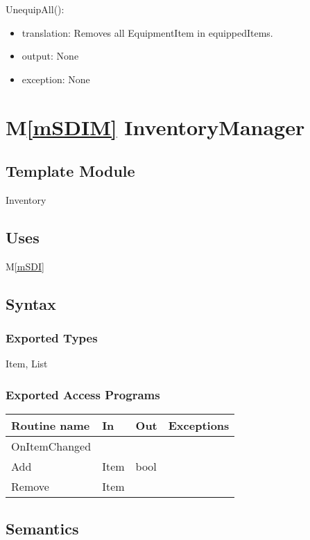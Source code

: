 \documentclass[12pt]{article}
\newcommand{\mref}[1]{M\ref{#1}}
\begin{document}
\noindent UnequipAll():
\begin{itemize}
\item translation: Removes all EquipmentItem in equippedItems.
\item output: None
\item exception: None
\end{itemize}

\newpage

\section* {\mref{mSDIM} InventoryManager}

\subsection*{Template Module}

Inventory

\subsection* {Uses}

\mref{mSDI}

\subsection* {Syntax}

\subsubsection* {Exported Types}

Item, List

\subsubsection* {Exported Access Programs}

\begin{tabular}{| l | l | l | l |}
\hline
\textbf{Routine name} & \textbf{In} & \textbf{Out} & \textbf{Exceptions}\\
\hline
OnItemChanged & ~ & ~  & ~\\
Add & Item & bool & ~\\
Remove & Item & ~  & ~\\
\hline
\end{tabular}

\subsection* {Semantics}
\end{document}
